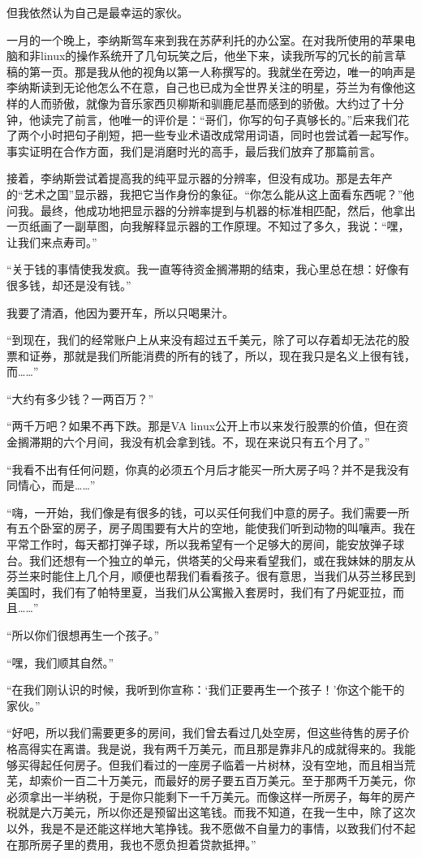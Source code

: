 但我依然认为自己是最幸运的家伙。

 

一月的一个晚上，李纳斯驾车来到我在苏萨利托的办公室。在对我所使用的苹果电脑和非linux的操作系统开了几句玩笑之后，他坐下来，读我所写的冗长的前言草稿的第一页。那是我从他的视角以第一人称撰写的。我就坐在旁边，唯一的响声是李纳斯读到无论他怎么不在意，自己也已成为全世界关注的明星，芬兰为有像他这样的人而骄傲，就像为音乐家西贝柳斯和驯鹿尼基而感到的骄傲。大约过了十分钟，他读完了前言，他唯一的评价是：“哥们，你写的句子真够长的。”后来我们花了两个小时把句子削短，把一些专业术语改成常用词语，同时也尝试着一起写作。事实证明在合作方面，我们是消磨时光的高手，最后我们放弃了那篇前言。

接着，李纳斯尝试着提高我的纯平显示器的分辨率，但没有成功。那是去年产的“艺术之国”显示器，我把它当作身份的象征。“你怎么能从这上面看东西呢？”他问我。最终，他成功地把显示器的分辨率提到与机器的标准相匹配，然后，他拿出一页纸画了一副草图，向我解释显示器的工作原理。不知过了多久，我说：“嘿，让我们来点寿司。”

“关于钱的事情使我发疯。我一直等待资金搁滞期的结束，我心里总在想：好像有很多钱，却还是没有钱。”

我要了清酒，他因为要开车，所以只喝果汁。

“到现在，我们的经常账户上从来没有超过五千美元，除了可以存着却无法花的股票和证券，那就是我们所能消费的所有的钱了，所以，现在我只是名义上很有钱，而……”

“大约有多少钱？一两百万？”

“两千万吧？如果不再下跌。那是VA linux公开上市以来发行股票的价值，但在资金搁滞期的六个月间，我没有机会拿到钱。不，现在来说只有五个月了。”

“我看不出有任何问题，你真的必须五个月后才能买一所大房子吗？并不是我没有同情心，而是……”

“嗨，一开始，我们像是有很多的钱，可以买任何我们中意的房子。我们需要一所有五个卧室的房子，房子周围要有大片的空地，能使我们听到动物的叫嚷声。我在平常工作时，每天都打弹子球，所以我希望有一个足够大的房间，能安放弹子球台。我们还想有一个独立的单元，供塔芙的父母来看望我们，或在我妹妹的朋友从芬兰来时能住上几个月，顺便也帮我们看看孩子。很有意思，当我们从芬兰移民到美国时，我们有了帕特里夏，当我们从公寓搬入套房时，我们有了丹妮亚拉，而且……”

“所以你们很想再生一个孩子。”

“嘿，我们顺其自然。”

“在我们刚认识的时候，我听到你宣称：‘我们正要再生一个孩子！’你这个能干的家伙。”

“好吧，所以我们需要更多的房间，我们曾去看过几处空房，但这些待售的房子价格高得实在离谱。我是说，我有两千万美元，而且那是靠非凡的成就得来的。我能够买得起任何房子。但我们看过的一座房子临着一片树林，没有空地，而且相当荒芜，却索价一百二十万美元，而最好的房子要五百万美元。至于那两千万美元，你必须拿出一半纳税，于是你只能剩下一千万美元。而像这样一所房子，每年的房产税就是六万美元，所以你还是预留出这笔钱。而我不知道，在我一生中，除了这次以外，我是不是还能这样地大笔挣钱。我不愿做不自量力的事情，以致我们付不起在那所房子里的费用，我也不愿负担着贷款抵押。”


